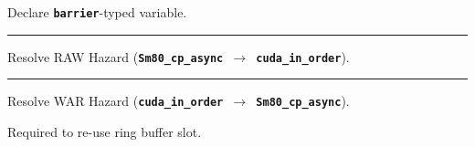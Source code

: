 {\LARGE
Declare \textbf{\texttt{barrier}}-typed variable.

}

\newpage
{}

{\large

}

\vspace{3mm}
\hrule

{\LARGE
Resolve RAW Hazard (\textbf{\texttt{Sm80\_cp\_async $\to$ cuda\_in\_order}}).

}

\newpage
{}

{\large

}

\vspace{3mm}
\hrule

{\LARGE
Resolve WAR Hazard (\textbf{\texttt{cuda\_in\_order $\to$ Sm80\_cp\_async}}).

Required to re-use ring buffer slot.

}
















